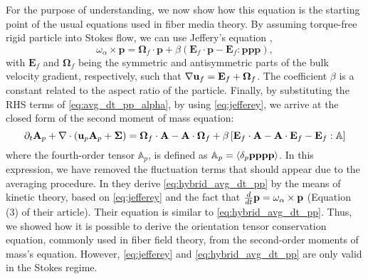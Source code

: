 For the purpose of understanding, we now show how this equation is the starting point of the usual equations used in fiber media theory. 
By assuming torque-free rigid particle into Stokes flow, we can use Jeffery's equation \citep{guazzelli2011},
\begin{equation}
    \omega_\alpha \times \textbf{p}
    = \bm{\Omega}_f\cdot\textbf{p}
    + \beta\left(
        \textbf{E}_f\cdot \textbf{p}
        - \textbf{E}_f : \textbf{ppp}
    \right),
    \label{eq:jefferey}
\end{equation}
with $\textbf{E}_f$ and $\bm{\Omega}_f$ being the symmetric and antisymmetric parts of the bulk velocity gradient, respectively, such that $\mathbf{\nabla} \textbf{u}_f=\textbf{E}_f+\bm{\Omega}_f$.
The coefficient $\beta$  is a constant related to the aspect ratio of the particle.
Finally, by substituting the RHS terms of \ref{eq:avg_dt_pp_alpha}, by using \ref{eq:jefferey}, we arrive at the closed form of the second moment of mass equation:
\begin{equation}
    \pddt \textbf{A}_p
    + \div (
        \textbf{u}_p\textbf{A}_p
        + \mathbf{\Sigma}
    )
    =
    \bm{\Omega}_f \cdot \textbf{A}
    - \textbf{A} \cdot \bm{\Omega}_f
    + \beta\left[
        \textbf{E}_f \cdot \textbf{A}
        -\textbf{A} \cdot \textbf{E}_f
        - \textbf{E}_f : \mathbb{A}
    \right]
    \label{eq:hybrid_avg_dt_pp}
\end{equation}
where the fourth-order tensor $\mathbb{A}_p$, is defined as $\mathbb{A}_p = \left<\delta_p \textbf{pppp}\right>$.
In this expression, we have removed the fluctuation terms that should appear due to the averaging procedure. 
In \citet{wang2008objective} they derive \ref{eq:hybrid_avg_dt_pp} by the means of kinetic theory, based on \ref{eq:jefferey} and the fact that $\frac{d}{dt} \textbf{p} = \omega_\alpha \times \textbf{p}$ (Equation (3) of their article).
Their equation is similar to \ref{eq:hybrid_avg_dt_pp}.
Thus, we showed how it is possible to derive the orientation tensor conservation equation, commonly used in fiber field theory, from the second-order moments of mass's equation. 
However, \ref{eq:jefferey} and \ref{eq:hybrid_avg_dt_pp} are only valid in the Stokes regime. 


